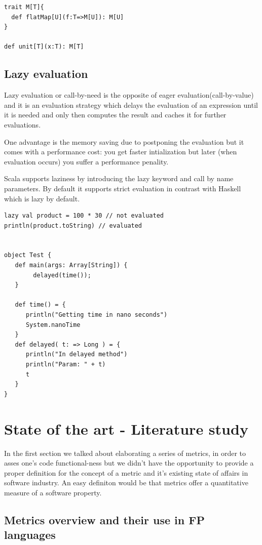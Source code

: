 \documentclass{article}
\begin{document}
\begin{lstlisting}
trait M[T]{
  def flatMap[U](f:T=>M[U]): M[U]
}

def unit[T](x:T): M[T]
\end{lstlisting}

\subsection {Lazy evaluation}
Lazy evaluation or call-by-need is the opposite of eager evaluation(call-by-value) and it is an evaluation strategy which delays the evaluation of an expression until it is needed and only then computes the result and caches it for further evaluations. \par
One advantage is the memory saving due to postponing the evaluation but it comes with a performance cost: you get faster intialization but later (when evaluation occurs) you suffer a performance penality.\par

Scala supports laziness by introducing the lazy keyword and call by name parameters. By default it supports strict evaluation in contrast with Haskell which is lazy by default.

\begin{lstlisting}
lazy val product = 100 * 30 // not evaluated
println(product.toString) // evaluated 


object Test {
   def main(args: Array[String]) {
        delayed(time());
   }

   def time() = {
      println("Getting time in nano seconds")
      System.nanoTime
   }
   def delayed( t: => Long ) = {
      println("In delayed method")
      println("Param: " + t)
      t
   }
}

\end{lstlisting}

\section {State of the art - Literature study}
In the first section we talked about elaborating a series of metrics, in order to asses one's code functional-ness but we didn't have the opportunity to provide a proper definition for the concept of a metric and it's existing state of affairs in software industry. An easy definiton would be that metrics offer a quantitative measure of a software property. 

\subsection{Metrics overview and their use in FP languages}
\end{document}
